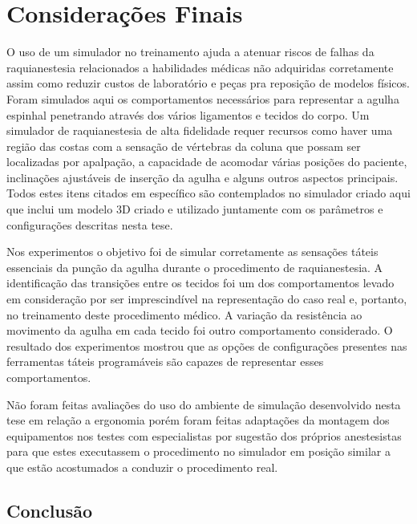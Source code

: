 \chapter{Considerações Finais} \label{cap:cap6}

O uso de um simulador no treinamento ajuda a atenuar riscos de falhas da raquianestesia relacionados a habilidades médicas não adquiridas corretamente assim como reduzir custos de laboratório e peças pra reposição de modelos físicos. Foram simulados aqui os comportamentos necessários para representar a agulha espinhal penetrando através dos vários ligamentos e tecidos do corpo. Um simulador de raquianestesia de alta fidelidade requer recursos como haver uma região das costas com a sensação de vértebras da coluna que possam ser localizadas por apalpação, a capacidade de acomodar várias posições do paciente, inclinações ajustáveis de inserção da agulha e alguns outros aspectos principais. Todos estes itens citados em específico são contemplados no simulador criado aqui que inclui um modelo 3D criado e utilizado juntamente com os parâmetros e configurações descritas nesta tese. 

Nos experimentos o objetivo foi de simular corretamente as sensações táteis essenciais da punção da agulha durante o procedimento de raquianestesia. A identificação das transições entre os tecidos foi um dos comportamentos levado em consideração por ser imprescindível na representação do caso real e, portanto, no treinamento deste procedimento médico.
A variação da resistência ao movimento da agulha em cada tecido foi outro comportamento considerado. O resultado dos experimentos mostrou que as opções de configurações presentes nas ferramentas táteis programáveis são capazes de representar esses comportamentos.

Não foram feitas avaliações do uso do ambiente de simulação desenvolvido nesta tese em relação a ergonomia porém foram feitas adaptações da montagem dos equipamentos nos testes com especialistas por sugestão dos próprios anestesistas para que estes executassem o procedimento no simulador em posição similar a que estão acostumados a conduzir o procedimento real.

\section{Conclusão}
\label{sec:conclusão}

